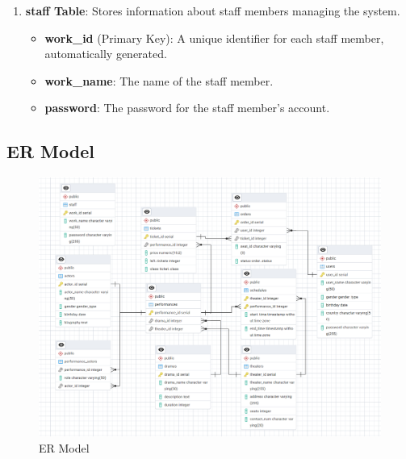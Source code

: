 \documentclass[12pt]{article}
\begin{document}
\begin{enumerate}
    \item \textbf{staff Table}: Stores information about staff members managing the system.
    \begin{itemize}
        \item \textbf{work\_id} (Primary Key): A unique identifier for each staff member, automatically generated.
        \item \textbf{work\_name}: The name of the staff member.
        \item \textbf{password}: The password for the staff member's account.
    \end{itemize}
\end{enumerate}
\subsection{ER Model}
\begin{figure}[h]
    \centering
    \includegraphics[width=\textwidth]{ER Model.png}
    \caption{ER Model}
    \label{Figure 1}
\end{figure}
\end{document}
